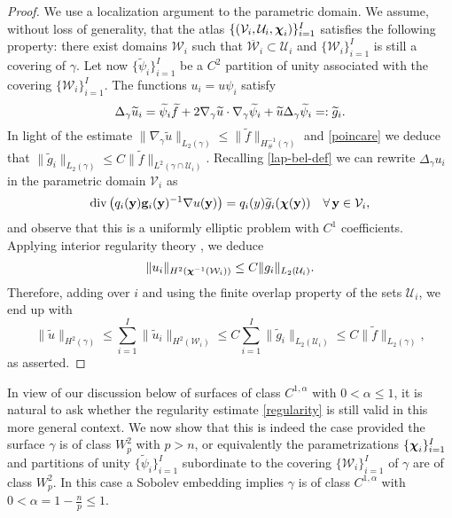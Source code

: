 \begin{proof}
We use a localization argument to the parametric domain. We assume, without loss
of generality, that the atlas $\{(\mathcal{V}_i,\mathcal{U}_i,{\boldsymbol \chi}_i)\}_{i=1}^I$
satisfies the
following property: there exist domains $\mathcal{W}_i$ such that
$\overline{\mathcal{W}}_i \subset \mathcal{U}_i$ and $\{\mathcal{W}_i\}_{i=1}^I$ is
still a covering of $\gamma$.
Let now $\{\widetilde \psi_i\}_{i=1}^I$ be a $C^2$ partition of unity associated with the
covering $\{\mathcal{W}_i\}_{i=1}^I$. The functions $u_i=u\psi_i$ satisfy 
%
\[
\Delta_\gamma \widetilde u_i = \widetilde \psi_i \widetilde f + 2\nabla_\gamma \widetilde u \cdot \nabla_\gamma \widetilde \psi_i + \widetilde{u} \Delta_\gamma \widetilde \psi_i=:  \widetilde g_i.
\]
%
In light of the estimate $\| \nabla_\gamma \widetilde u\|_{L_2(\gamma)} \leq \| \widetilde f \|_{H^{-1}_\#(\gamma)}$ and \eqref{poincare} we deduce that $\|\widetilde g_i\|_{L_2(\gamma)} \le C \|\widetilde f\|_{L^2(\gamma\cap\mathcal{U}_i)}$. 
Recalling \eqref{lap-bel-def} we can rewrite $\Delta_\gamma u_i$ in the parametric domain $\mathcal{V}_i$ as
%
\[
\mathrm{div}\left( q_i({\bf y}) {\bf g}_i({\bf y})^{-1} \nabla u({\bf y}) \right) = q_i(y) \widetilde g_i({\boldsymbol \chi}({\bf y}))
\quad\forall \, {\bf y}\in\mathcal{V}_i,
\]
%
and observe that this is a uniformly elliptic problem with $C^1$ coefficients.
Applying interior regularity theory \cite{Ev98}, we deduce
%
\[
\|u_i\|_{H^2({\boldsymbol \chi}^{-1}(\mathcal{W}_i))} \le C \|g_i\|_{L_2(\mathcal{U}_i)}.
\]
%
Therefore, adding over $i$ and using the finite overlap property of the
sets $\mathcal{U}_i$, we end up with
%
\[
\|\widetilde u\|_{H^2(\gamma)} \le \sum_{i=1}^I \| \widetilde u_i\|_{H^2(\mathcal{W}_i)}
\le C \sum_{i=1}^I \| \widetilde g_i\|_{L_2(\mathcal{U}_i)} \le
 C \|\widetilde f\|_{L_2(\gamma)} ,
\]
%
as asserted.
\end{proof}  

In view of our discussion below of surfaces of class $C^{1,\alpha}$ with $0<\alpha\le1$, it is natural to ask whether the regularity estimate \eqref{regularity} is still valid in
this more general context. We now show that this is indeed the case provided
the surface $\gamma$ is of class $W^2_p$ with $p>n$, or equivalently the
parametrizations $\{{\boldsymbol \chi}_i\}_{i=1}^I$ and partitions of unity $\{\widetilde \psi_i\}_{i=1}^I$ subordinate to the covering $\{\mathcal{W}_i\}_{i=1}^I$ of $\gamma$
are of class $W^2_p$. In this case a Sobolev embedding implies $\gamma$ is of class
$C^{1,\alpha}$ with $0< \alpha=1-\frac{n}{p} \le 1$.

